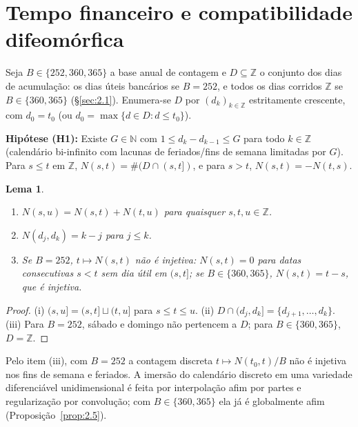 \documentclass[11pt, a4paper]{article}
\theoremstyle{definition}
\theoremstyle{plain}
\newtheorem{lema}[definicao]{Lema}
\theoremstyle{remark}
\begin{document}
\section{Tempo financeiro e compatibilidade difeomórfica}\label{sec:2}

Seja $B \in \{252, 360, 365\}$ a base anual de contagem e $D \subseteq \mathbb{Z}$ o conjunto dos dias de acumulação: os dias úteis bancários se $B = 252$, e todos os dias corridos $\mathbb{Z}$ se $B \in \{360, 365\}$ (\S\ref{sec:2.1}). Enumera-se $D$ por $(d_k)_{k \in \mathbb{Z}}$ estritamente crescente, com $d_0 = t_0$ (ou $d_0 = \max\{d \in D : d \le t_0\}$).

\medskip\noindent\textbf{Hipótese (H1):} Existe $G \in \mathbb{N}$ com $1 \le d_k - d_{k-1} \le G$ para todo $k \in \mathbb{Z}$ (calendário bi-infinito com lacunas de feriados/fins de semana limitadas por $G$). Para $s \le t$ em $\mathbb{Z}$, $N(s,t) = \#(D \cap (s,t])$, e para $s > t$, $N(s,t) = -N(t,s)$.

\begin{lema}\label{lem:2.1}
\begin{enumerate}[label=(\roman*)]
    \item $N(s,u) = N(s,t) + N(t,u)$ para quaisquer $s, t, u \in \mathbb{Z}$.
    \item $N(d_j, d_k) = k - j$ para $j \le k$.
    \item Se $B = 252$, $t \mapsto N(s,t)$ não é injetiva: $N(s,t) = 0$ para datas consecutivas $s < t$ sem dia útil em $(s,t]$; se $B \in \{360, 365\}$, $N(s,t) = t - s$, que é injetiva.
\end{enumerate}
\end{lema}
\begin{proof}
(i) $(s,u] = (s,t] \sqcup (t,u]$ para $s \le t \le u$. (ii) $D \cap (d_j, d_k] = \{d_{j+1}, \dots, d_k\}$. (iii) Para $B = 252$, sábado e domingo não pertencem a $D$; para $B \in \{360, 365\}$, $D = \mathbb{Z}$.
\end{proof}

Pelo item (iii), com $B = 252$ a contagem discreta $t \mapsto N(t_0, t)/B$ não é injetiva nos fins de semana e feriados. A imersão do calendário discreto em uma variedade diferenciável unidimensional é feita por interpolação afim por partes e regularização por convolução; com $B \in \{360, 365\}$ ela já é globalmente afim (Proposição~\ref{prop:2.5}).
\end{document}
